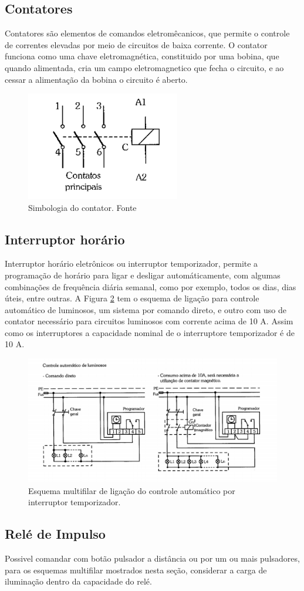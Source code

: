 \subsection{Contatores}
Contatores são elementos de comandos eletromêcanicos, que permite o controle de correntes elevadas por meio de circuitos de baixa corrente. O contator funciona como uma chave eletromagnética, constituido por uma bobina, que quando alimentada, cria um campo eletromagnetico que fecha o circuito, e ao cessar a alimentação da bobina o circuito é aberto. 
%
\begin{figure}[h]
    \centering
    \includegraphics[width=0.6\textwidth]{image/contator_simbolo.png}
    
    \caption{Simbologia do contator. Fonte\cite{Franchi2008}}
   \label{fig:bornes}
\end{figure}

\subsection{Interruptor horário}
Interruptor horário eletrônicos ou interruptor temporizador, permite a programação de horário para ligar e desligar automáticamente, com algumas combinações de frequência diária semanal, como por exemplo, todos os dias, dias úteis, entre outras.
A Figura \ref{fig:esqtemp_1} tem o esquema de ligação para controle automático de luminosos, um sistema por comando direto, e outro com uso de contator necessário para circuitos luminosos com corrente acima de 10 A. Assim como os interruptores a capacidade nominal de o interruptore temporizador é de 10 A.
\begin{figure}
\centering
	\includegraphics[width=\textwidth]{image/esqTemp.png}
	\caption{Esquema multifilar de ligação do controle automático por interruptor temporizador.}
	\label{fig:esqtemp_1}
\end{figure}


\subsection{Relé de Impulso}
Possivel comandar com botão pulsador a distância ou por um ou mais pulsadores, para os esquemas multifilar mostrados nesta seção, considerar a carga de iluminação dentro da capacidade do relé.
